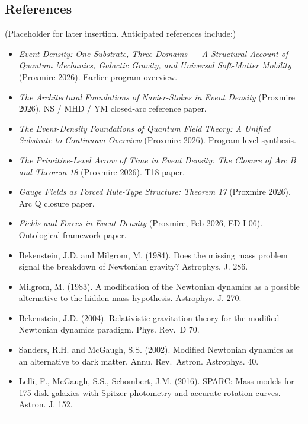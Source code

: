 \documentclass[
  11pt,a4paper]{article}
\providecommand{\tightlist}{%
  \setlength{\itemsep}{0pt}\setlength{\parskip}{0pt}}
\begin{document}
\subsection{References}\label{references}

(Placeholder for later insertion. Anticipated references include:)

\begin{itemize}
\tightlist
\item
  \emph{Event Density: One Substrate, Three Domains --- A Structural
  Account of Quantum Mechanics, Galactic Gravity, and Universal
  Soft-Matter Mobility} (Proxmire 2026). Earlier program-overview.
\item
  \emph{The Architectural Foundations of Navier-Stokes in Event Density}
  (Proxmire 2026). NS / MHD / YM closed-arc reference paper.
\item
  \emph{The Event-Density Foundations of Quantum Field Theory: A Unified
  Substrate-to-Continuum Overview} (Proxmire 2026). Program-level
  synthesis.
\item
  \emph{The Primitive-Level Arrow of Time in Event Density: The Closure
  of Arc B and Theorem 18} (Proxmire 2026). T18 paper.
\item
  \emph{Gauge Fields as Forced Rule-Type Structure: Theorem 17}
  (Proxmire 2026). Arc Q closure paper.
\item
  \emph{Fields and Forces in Event Density} (Proxmire, Feb 2026,
  ED-I-06). Ontological framework paper.
\item
  Bekenstein, J.D. and Milgrom, M. (1984). Does the missing mass problem
  signal the breakdown of Newtonian gravity? Astrophys. J. 286.
\item
  Milgrom, M. (1983). A modification of the Newtonian dynamics as a
  possible alternative to the hidden mass hypothesis. Astrophys. J. 270.
\item
  Bekenstein, J.D. (2004). Relativistic gravitation theory for the
  modified Newtonian dynamics paradigm. Phys. Rev.~D 70.
\item
  Sanders, R.H. and McGaugh, S.S. (2002). Modified Newtonian dynamics as
  an alternative to dark matter. Annu. Rev.~Astron. Astrophys. 40.
\item
  Lelli, F., McGaugh, S.S., Schombert, J.M. (2016). SPARC: Mass models
  for 175 disk galaxies with Spitzer photometry and accurate rotation
  curves. Astron. J. 152.
\end{itemize}

\begin{center}\rule{0.5\linewidth}{0.5pt}\end{center}
\end{document}
